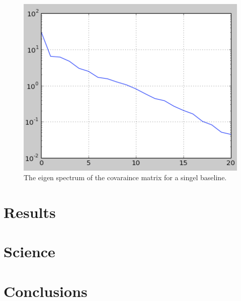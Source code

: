 \documentclass[twocolumn,numberedappendix]{emulateapj}
\begin{document}
\begin{figure}[h!]\centering
\includegraphics[width=\columnwidth, height=.8\columnwidth]{plots/lam_example.png}
\caption{The eigen spectrum of the covaraince matrix for a singel baseline.}
\label{fig:lam_example}
\end{figure}


% 


\section{Results}

\section{Science}

\section{Conclusions}




\end{document}
